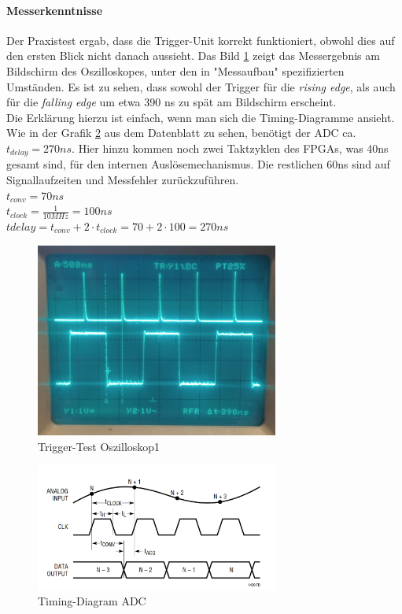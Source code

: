\paragraph{Messerkenntnisse}
Der Praxistest ergab, dass die Trigger-Unit korrekt funktioniert, obwohl dies auf den ersten Blick nicht danach aussieht. Das Bild \ref{Messung_Trigger} zeigt das Messergebnis am Bildschirm des Oszilloskopes, unter den in "Messaufbau" spezifizierten Umständen. Es ist zu sehen, dass sowohl der Trigger für die \textit{rising edge}, als auch für die \textit{falling edge} um etwa 390 ns zu spät am Bildschirm erscheint.
\\Die Erklärung hierzu ist einfach, wenn man sich die Timing-Diagramme ansieht. Wie in der Grafik \ref{Timing_Diagramm} aus dem Datenblatt zu sehen, benötigt der ADC ca. $t_{delay} = 270 ns$. Hier hinzu kommen noch zwei Taktzyklen des FPGAs, was 40ns gesamt sind, für den internen Auslösemechanismus. Die restlichen 60ns sind auf Signallaufzeiten und Messfehler zurückzuführen.
\\$t_{conv} = 70ns$\\$t_{clock} = \frac{1}{10MHz} = 100ns$\\$t{delay} = t_{conv} + 2 \cdot t_{clock} = 70 + 2 \cdot 100 = 270 ns$

\begin{figure}[h]
	\begin{center}
		\includegraphics[width=8cm]{SAUER/Grafiken/Trigger/Trigger_Oszi.jpg}
		\caption{Trigger-Test Oszilloskop1}
		\label{Messung_Trigger}
	\end{center}
\end{figure}
\begin{figure}[h]
	\begin{center}
		\includegraphics[width=8cm]{SAUER/Grafiken/Trigger/ADC_timing_diagram.PNG}
		\caption{Timing-Diagram ADC}
		\label{Timing_Diagramm}
	\end{center}
\end{figure}